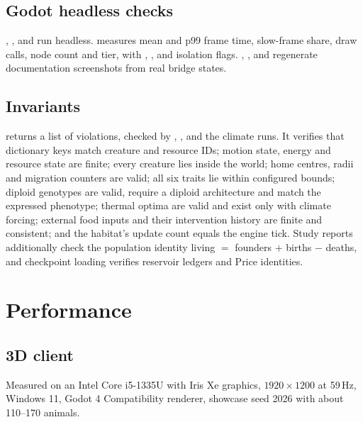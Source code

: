 \section{Godot headless checks}
, , 
and  run headless.  measures mean and p99 frame
time, slow-frame share, draw calls, node count and tier, with ,
,  and  isolation flags.
, ,  and
 regenerate documentation screenshots from real bridge states.

\section{Invariants}
 returns a list of violations, checked by
, ,  and the climate runs. It verifies that
dictionary keys match creature and resource IDs; motion state, energy and resource
state are finite; every creature lies inside the world; home centres, radii and
migration counters are valid; all six traits lie within configured bounds; diploid
genotypes are valid, require a diploid architecture and match the expressed
phenotype; thermal optima are valid and exist only with climate forcing; external
food inputs and their intervention history are finite and consistent; and the
habitat's update count equals the engine tick. Study reports additionally check
the population identity living $=$ founders $+$ births $-$ deaths, and checkpoint
loading verifies reservoir ledgers and Price identities.

\chapter{Performance}

\section{3D client}
Measured on an Intel Core i5-1335U with Iris Xe graphics, $1920\times1200$ at
59\,Hz, Windows 11, Godot 4 Compatibility renderer, showcase seed 2026 with about
110--170 animals.


